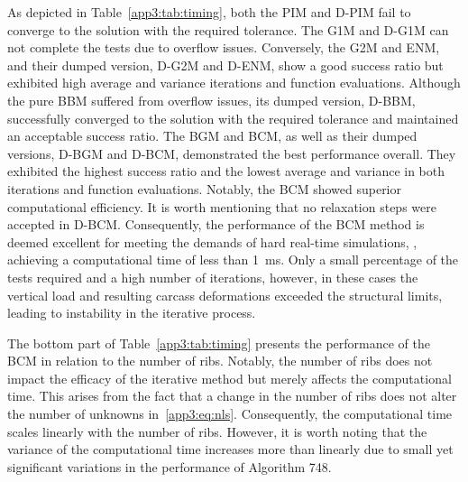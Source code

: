 As depicted in Table~\ref{app3:tab:timing}, both the PIM and D-PIM fail to converge to the solution with the required tolerance. The G1M and D-G1M can not complete the tests due to overflow issues. Conversely, the G2M and ENM, and their dumped version, D-G2M and D-ENM, show a good success ratio but exhibited high average and variance iterations and function evaluations. Although the pure BBM suffered from overflow issues, its dumped version, D-BBM, successfully converged to the solution with the required tolerance and maintained an acceptable success ratio. The BGM and BCM, as well as their dumped versions, D-BGM and D-BCM, demonstrated the best performance overall. They exhibited the highest success ratio and the lowest average and variance in both iterations and function evaluations. Notably, the BCM showed superior computational efficiency. It is worth mentioning that no relaxation steps were accepted in D-BCM. Consequently, the performance of the BCM method is deemed excellent for meeting the demands of hard real-time simulations, \ie{}, achieving a computational time of less than \SI{1}{\milli\second}. Only a small percentage of the tests required and a high number of iterations, however, in these cases the vertical load and resulting carcass deformations exceeded the structural limits, leading to instability in the iterative process.

The bottom part of Table~\ref{app3:tab:timing} presents the performance of the BCM in relation to the number of ribs. Notably, the number of ribs does not impact the efficacy of the iterative method but merely affects the computational time. This arises from the fact that a change in the number of ribs does not alter the number of unknowns in~\eqref{app3:eq:nls}. Consequently, the computational time scales linearly with the number of ribs. However, it is worth noting that the variance of the computational time increases more than linearly due to small yet significant variations in the performance of Algorithm 748.

